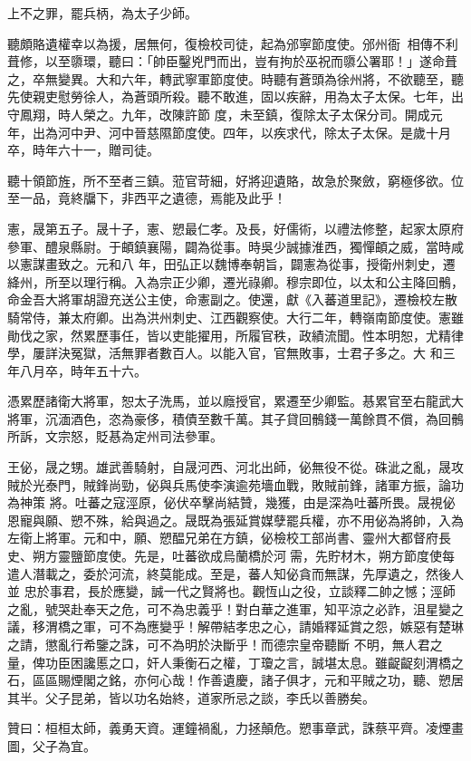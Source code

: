 \begin{pinyinscope}
 上不之罪，罷兵柄，為太子少師。



 聽頗賂遺權幸以為援，居無何，復檢校司徒，起為邠寧節度使。邠州衙，相傳不利葺修，以至隳環，聽曰：「帥臣鑿兇門而出，豈有拘於巫祝而隳公署耶！」遂命葺之，卒無變異。大和六年，轉武寧軍節度使。時聽有蒼頭為徐州將，不欲聽至，聽先使親吏慰勞徐人，為蒼頭所殺。聽不敢進，固以疾辭，用為太子太保。七年，出守鳳翔，時人榮之。九年，改陳許節
 度，未至鎮，復除太子太保分司。開成元年，出為河中尹、河中晉慈隰節度使。四年，以疾求代，除太子太保。是歲十月卒，時年六十一，贈司徒。



 聽十領節旌，所不至者三鎮。蒞官苛細，好將迎遺賂，故急於聚斂，窮極侈欲。位至一品，竟終牖下，非西平之遺德，焉能及此乎！



 憲，晟第五子。晟十子，憲、愬最仁孝。及長，好儒術，以禮法修整，起家太原府參軍、醴泉縣尉。于頔鎮襄陽，闢為從事。時吳少誠據淮西，獨憚頔之威，當時咸以憲謀畫致之。元和八
 年，田弘正以魏博奉朝旨，闢憲為從事，授衛州刺史，遷絳州，所至以理行稱。入為宗正少卿，遷光祿卿。穆宗即位，以太和公主降回鶻，命金吾大將軍胡證充送公主使，命憲副之。使還，獻《入蕃道里記》，遷檢校左散騎常侍，兼太府卿。出為洪州刺史、江西觀察使。大行二年，轉嶺南節度使。憲雖勛伐之家，然累歷事任，皆以吏能擢用，所履官秩，政績流聞。性本明恕，尤精律學，屢詳決冤獄，活無罪者數百人。以能入官，官無敗事，士君子多之。大
 和三年八月卒，時年五十六。



 憑累歷諸衛大將軍，恕太子洗馬，並以廕授官，累遷至少卿監。惎累官至右龍武大將軍，沉湎酒色，恣為豪侈，積債至數千萬。其子貸回鶻錢一萬餘貫不償，為回鶻所訴，文宗怒，貶惎為定州司法參軍。



 王佖，晟之甥。雄武善騎射，自晟河西、河北出師，佖無役不從。硃泚之亂，晟攻賊於光泰門，賊鋒尚勁，佖與兵馬使李演逾苑墻血戰，敗賊前鋒，諸軍方振，論功為神策
 將。吐蕃之寇涇原，佖伏卒擊尚結贊，幾獲，由是深為吐蕃所畏。晟視佖恩寵與願、愬不殊，給與過之。晟既為張延賞媒孽罷兵權，亦不用佖為將帥，入為左衛上將軍。元和中，願、愬醖兄弟在方鎮，佖檢校工部尚書、靈州大都督府長史、朔方靈鹽節度使。先是，吐蕃欲成烏蘭橋於河需，先貯材木，朔方節度使每遣人潛載之，委於河流，終莫能成。至是，蕃人知佖貪而無謀，先厚遺之，然後人並
 忠於事君，長於應變，誠一代之賢將也。觀恆山之役，立談釋二帥之憾；涇師之亂，號哭赴奉天之危，可不為忠義乎！對白華之進軍，知平涼之必詐，沮星變之議，移渭橋之軍，可不為應變乎！解帶結孝忠之心，請婚釋延賞之怨，嫉惡有楚琳之請，懲亂行希鑒之誅，可不為明於決斷乎！而德宗皇帝聽斷
 不明，無人君之量，俾功臣困讒慝之口，奸人秉衡石之權，丁瓊之言，誠堪太息。雖齪齪刻渭橋之石，區區賜煙閣之銘，亦何心哉！作善遺慶，諸子俱才，元和平賊之功，聽、愬居其半。父子昆弟，皆以功名始終，道家所忌之談，李氏以善勝矣。



 贊曰：桓桓太師，義勇天資。運鐘禍亂，力拯顛危。愬事章武，誅蔡平齊。凌煙畫圖，父子為宜。



\end{pinyinscope}